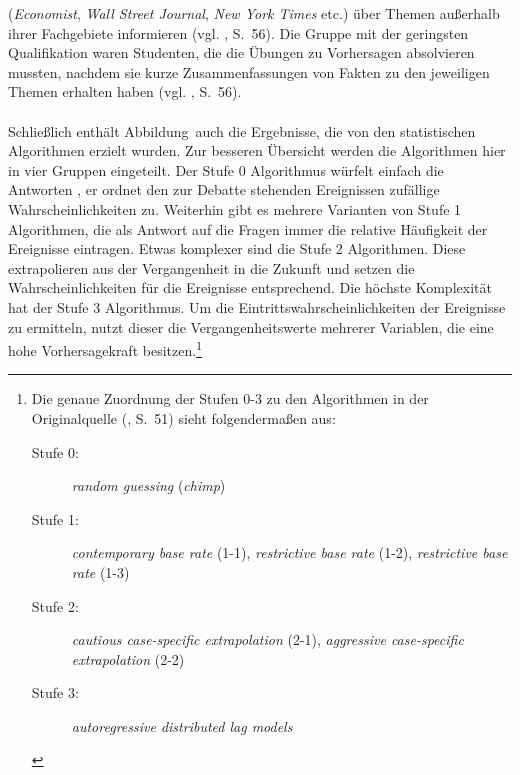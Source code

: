 (\emph{Economist}, \emph{Wall Street Journal}, \emph{New York Times} etc.) über
Themen außerhalb ihrer Fachgebiete informieren (vgl. \cite{Tetlock}, S.~56).
Die Gruppe mit der geringsten Qualifikation waren Studenten, die die Übungen
zu Vorhersagen absolvieren mussten, nachdem sie kurze Zusammenfassungen von
Fakten zu den jeweiligen Themen erhalten haben (vgl. \cite{Tetlock}, S.~56).
\\ \\
Schließlich enthält Abbildung~\xcom auch die Ergebnisse, die von den
statistischen Algorithmen erzielt wurden. Zur besseren Übersicht werden die
Algorithmen hier in vier Gruppen eingeteilt. Der Stufe 0 Algorithmus würfelt
einfach die Antworten , er ordnet den zur Debatte stehenden Ereignissen
zufällige Wahrscheinlichkeiten zu. Weiterhin gibt es mehrere Varianten von
Stufe 1 Algorithmen, die als Antwort auf die Fragen immer die relative
Häufigkeit der Ereignisse eintragen. Etwas komplexer sind die Stufe 2
Algorithmen. Diese extrapolieren aus der Vergangenheit in die Zukunft und setzen
die Wahrscheinlichkeiten für die Ereignisse entsprechend. Die höchste
Komplexität hat der Stufe 3 Algorithmus. Um die Eintrittswahrscheinlichkeiten
der Ereignisse zu ermitteln, nutzt dieser die Vergangenheitswerte mehrerer
Variablen, die eine hohe Vorhersagekraft besitzen.\footnote{Die genaue Zuordnung
der Stufen 0-3 zu den Algorithmen in der Originalquelle (\cite{Tetlock}, S.~51)
sieht folgendermaßen aus:
\begin{description}
\item[Stufe 0:] \emph{random guessing} (\emph{chimp})
\item[Stufe 1:] \emph{contemporary base rate} (1-1), \emph{restrictive base
  rate} (1-2), \emph{restrictive base rate} (1-3)
\item[Stufe 2:] \emph{cautious case-specific extrapolation} (2-1),
  \emph{aggressive case-specific extrapolation} (2-2)
\item[Stufe 3:] \emph{autoregressive distributed lag models}
\end{description}
}
